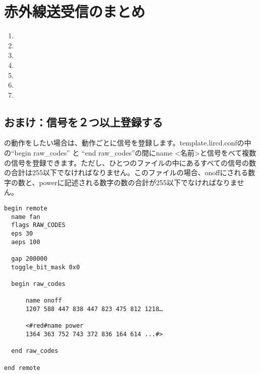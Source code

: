 \newpage
\section{赤外線送受信のまとめ}
\begin{enumerate}
\item {}
\item {}
\item {}
\item {}
\item {}
\item {}
\item {}
\end{enumerate}

\begin{tcolorbox}[title=\useOmetoi]
\begin{enumerate}
\end{enumerate}
\end{tcolorbox}

\newpage
\subsection{おまけ：信号を２つ以上登録する}
の動作をしたい場合は、動作ごとに信号を登録します。template.lircd.confの中の“begin raw\_codes” と “end raw\_codes”の間にname <名前>と信号をべて複数の信号を登録できます。ただし、ひとつのファイルの中にあるすべての信号の数の合計は255以下でなければなりません。このファイルの場合、onoffにされる数字の数と、powerに記述される数字の数の合計が255以下でなければなりません。\\

\begin{lstlisting}[caption=２つの信号を登録するときのtemplate.lircd.comf,label=２つの信号を登録するときのtemplate.lircd.comf]
begin remote
  name fan
  flags RAW_CODES
  eps 30
  aeps 100

  gap 200000
  toggle_bit_mask 0x0

  begin raw_codes

      name onoff
      1207 588 447 838 447 823 475 812 1218…

      <#red#name power
      1364 363 752 743 372 836 164 614 ...#>

  end raw_codes

end remote
\end{lstlisting}

